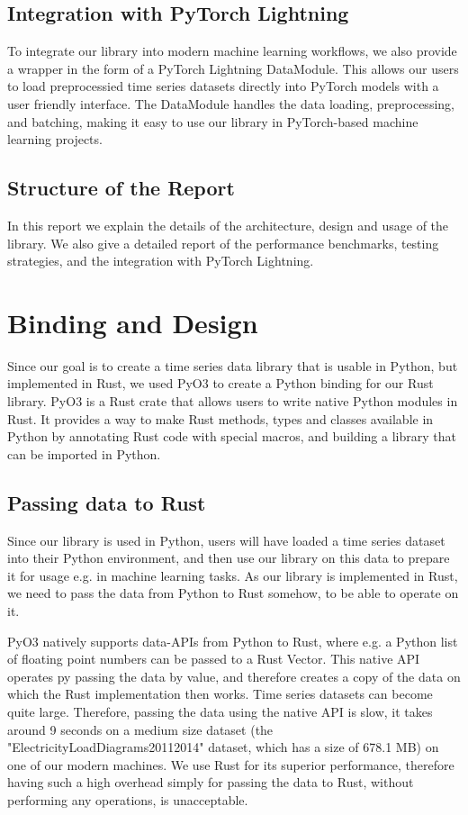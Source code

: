 \documentclass[review]{AIM_report}
\begin{document}
\subsection{Integration with PyTorch Lightning}
To integrate our library into modern machine learning workflows, we also provide a wrapper in the form of a PyTorch Lightning DataModule. This allows our users to load preprocessied time series datasets directly into PyTorch models with a user friendly interface. The DataModule handles the data loading, preprocessing, and batching, making it easy to use our library in PyTorch-based machine learning projects.

\subsection{Structure of the Report}
In this report we explain the details of the architecture, design and usage of the library. We also give a detailed report of the performance benchmarks, testing strategies, and the integration with PyTorch Lightning.

\newpage

\section{Binding and Design}
\label{sec:binding-and-design}

Since our goal is to create a time series data library that is usable in Python, but implemented in Rust, we used PyO3 to create a Python binding for our Rust library. PyO3 is a Rust crate that allows users to write native Python modules in Rust. It provides a way to make Rust methods, types and classes available in Python by annotating Rust code with special macros, and building a library that can be imported in Python.

\subsection{Passing data to Rust}

Since our library is used in Python, users will have loaded a time series dataset into their Python environment, and then use our library on this data to prepare it for usage e.g. in machine learning tasks. As our library is implemented in Rust, we need to pass the data from Python to Rust somehow, to be able to operate on it.

PyO3 natively supports data-APIs from Python to Rust, where e.g. a Python list of floating point numbers can be passed to a Rust Vector. This native API operates py passing the data by value, and therefore creates a copy of the data on which the Rust implementation then works. Time series datasets can become quite large. Therefore, passing the data using the native API is slow, it takes around 9 seconds on a medium size dataset (the "ElectricityLoadDiagrams20112014" dataset, which has a size of 678.1 MB) on one of our modern machines. We use Rust for its superior performance, therefore having such a high overhead simply for passing the data to Rust, without performing any operations, is unacceptable.
\end{document}
